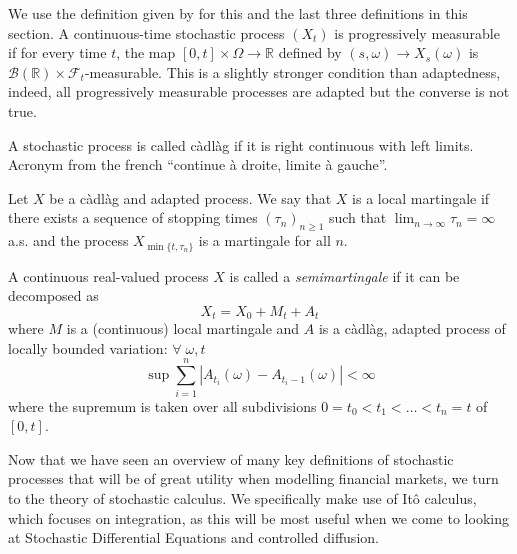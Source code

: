 \begin{definition}
    We use the definition given by \cite{Pham} for this and the last three definitions 
    in this section.
    A continuous-time stochastic process $(X_t)$ is progressively measurable if
    for every time $t$, the map $[0,t]\times\Omega\rightarrow\mathbb{R}$ defined
    by $(s,\omega)\rightarrow X_s(\omega)$ is $\mathcal{B}(\mathbb{R})\times\mathcal{F}_t$-measurable.
    This is a slightly stronger condition than adaptedness, indeed, all progressively
    measurable processes are adapted but the converse is not true. 
\end{definition}

\begin{definition}[C\`{a}dl\`{a}g process]
    A stochastic process is called c\`{a}dl\`{a}g if it is right continuous with left 
    limits. Acronym from the french ``continue \`{a} droite, limite \`{a} gauche''.
\end{definition}

\begin{definition}
    Let $X$ be a c\`{a}dl\`{a}g and adapted process. We say that $X$ is a local martingale
    if there exists a sequence of stopping times $(\tau_n)_{n\geq1}$ such that 
    $\lim_{n\rightarrow\infty}\tau_n=\infty$ a.s. and the process $X_{\min\{t,\tau_n\}}$
    is a martingale for all $n$.
\end{definition}

\begin{definition}[Semimartingale]
    A continuous real-valued process $X$ is called a \emph{semimartingale} if it can 
    be decomposed as
    \begin{equation}
        X_t = X_0 + M_t + A_t
    \end{equation}
    where $M$ is a (continuous) local martingale and $A$ is a c\`{a}dl\`{a}g, adapted 
    process of locally bounded variation: $\forall\;\omega,t$
    \begin{equation*}
        \sup\sum_{i=1}^n|A_{t_i}(\omega)-A_{t_i-1}(\omega)|<\infty
    \end{equation*}
    where the supremum is taken over all subdivisions $0=t_0<t_1<\dots<t_n=t$ of 
    $[0,t]$.
\end{definition}

Now that we have seen an overview of many key definitions of stochastic processes 
that will be of great utility when modelling financial markets, we turn to the 
theory of stochastic calculus. We specifically make use of It\^{o} calculus, 
which focuses on integration, as this will be most useful when we come to looking 
at Stochastic Differential Equations and controlled diffusion.

